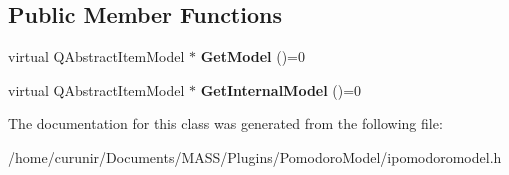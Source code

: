 \subsection*{Public Member Functions}
\begin{DoxyCompactItemize}
\item 
virtual Q\+Abstract\+Item\+Model $\ast$ {\bfseries Get\+Model} ()=0\hypertarget{class_i_pomodoro_model_a8de6ac3baca2a088fbaa6323fcfce4e0}{}\label{class_i_pomodoro_model_a8de6ac3baca2a088fbaa6323fcfce4e0}

\item 
virtual Q\+Abstract\+Item\+Model $\ast$ {\bfseries Get\+Internal\+Model} ()=0\hypertarget{class_i_pomodoro_model_a27a07cc7b6fa637a3de85338fc75696c}{}\label{class_i_pomodoro_model_a27a07cc7b6fa637a3de85338fc75696c}

\end{DoxyCompactItemize}


The documentation for this class was generated from the following file\+:\begin{DoxyCompactItemize}
\item 
/home/curunir/\+Documents/\+M\+A\+S\+S/\+Plugins/\+Pomodoro\+Model/ipomodoromodel.\+h\end{DoxyCompactItemize}
